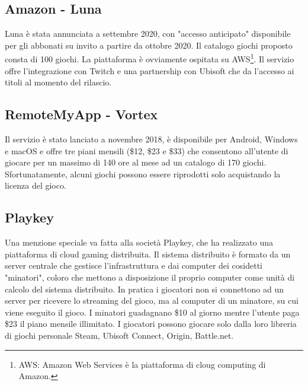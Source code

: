 \subsection{Amazon - Luna}
Luna è stata annunciata a settembre 2020, con "accesso anticipato" disponibile per gli abbonati su invito a partire da ottobre 2020. Il catalogo giochi proposto consta di 100 giochi. La piattaforma è ovviamente ospitata su AWS\footnote{AWS: Amazon Web Services è la piattaforma di cloug computing di Amazon.}. Il servizio offre l'integrazione con Twitch e una partnership con Ubisoft che da l'accesso ai titoli al momento del rilascio\cite{Amazon_Luna}.

\subsection{RemoteMyApp - Vortex}
Il servizio è stato lanciato a novembre 2018,  è disponibile per Android, Windows e macOS e offre tre piani mensili (\$12, \$23 e \$33) che consentono all'utente di giocare per un massimo di 140 ore al mese ad un catalogo di 170 giochi. Sfortunatamente, alcuni giochi possono essere riprodotti solo acquistando la licenza del gioco\cite{RemoteMyApp_Vortex}.

\subsection{Playkey}
Una menzione speciale va fatta alla società Playkey, che ha realizzato una piattaforma di cloud gaming distribuita. Il sistema distribuito è formato da un server centrale che gestisce l'infrastruttura e dai computer dei cosidetti "minatori", coloro che mettono a disposizione il proprio computer come unità di calcolo del sistema distribuito. In pratica i giocatori non si connettono ad un server per ricevere lo streaming del gioco, ma al computer di un minatore, su cui viene eseguito il gioco. I minatori guadagnano \$10 al giorno mentre l'utente paga \$23 il piano mensile illimitato. I giocatori possono giocare solo dalla loro libreria di giochi personale Steam, Ubisoft Connect, Origin, Battle.net\cite{Playkey}.